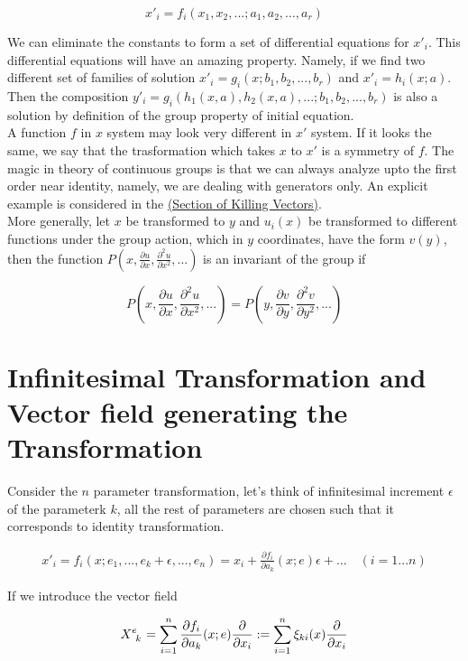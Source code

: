 \documentclass{report}
\begin{document}
$$x'_i = f_i(x_1,x_2,...; a_1,a_2,...,a_r)$$

\noindent We can eliminate the constants to form a set of differential equations for $x'_i$. This differential equations will have an amazing property. Namely, if we find two different set of families of solution $x'_i = g_i(x;b_1,b_2,...,b_r)$ and $x'_i = h_i(x;a)$. Then the composition $y'_i = g_i(h_1(x,a), h_2(x,a),...;b_1,b_2,...,b_r)$ is also a solution by definition of the group property of initial equation.\\

\noindent A function $f$ in $x$ system may look very different in $x'$ system. If it looks the same, we say that the trasformation which takes $x$ to $x'$ is a symmetry of $f$. The magic in theory of continuous groups is that we can always analyze upto the first order near identity, namely, we are dealing with generators only. An explicit example is considered in the \hyperref[sec:killing]{(Section of Killing Vectors)}.\\

\noindent More generally, let $x$ be transformed to $y$ and $u_i(x)$ be transformed to different functions under the group action, which in $y$ coordinates, have the form $v(y)$, then the function $P(x,\frac{\partial u}{\partial x}, \frac{\partial ^2 u}{\partial x^2},...)$ is an invariant of the group if 

$$ P\left(x,\frac{\partial u}{\partial x}, \frac{\partial ^2 u}{\partial x^2},...\right) = P\left(y,\frac{\partial v}{\partial y}, \frac{\partial ^2 v}{\partial y^2},...\right)$$

\section{Infinitesimal Transformation and Vector field generating the Transformation}

Consider the $n$ parameter transformation, let's think of infinitesimal increment $\epsilon$ of the parameterk $k$, all the rest of parameters are chosen such that it corresponds to identity transformation.

\begin{align}
x'_i = f_i(x;e_1,...,e_k+\epsilon,...,e_n)
= x_i + \frac{\partial f_i}{\partial a_k} (x;e)\epsilon + ... \quad(i = 1...n)
\end{align}

\noindent If we introduce the vector field

$$X\indices{^e_k} = \sum_{i=1}^{n} \frac{\partial f_i}{\partial a_k}(x;e) \frac{\partial}{\partial x_i} := \sum_{i=1}^{n}\xi_{ki}(x)\frac{\partial}{\partial x_i}$$
\end{document}
